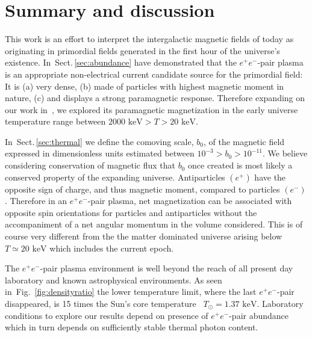 \documentclass[aps,prd,floatfix,reprint]{revtex4-2}
\newcommand*{\keV}{\text{ keV}}
\newcommand{\rf}[1]{Fig.~{\ref{#1}}}
\newcommand{\rsec}[1]{Sect.\,{\ref{#1}}}
\begin{document}

\section{Summary and discussion}
\label{sec:conclusions}
\noindent This work is an effort to interpret the intergalactic magnetic fields of today as originating in primordial fields generated in the first hour of the universe's existence. In~\rsec{sec:abundance} have demonstrated that the $e^{+}e^{-}$-pair plasma is an appropriate non-electrical current candidate source for the primordial field: It is (a) very dense, (b) made of particles with highest magnetic moment in nature, (c) and displays a strong paramagnetic response. Therefore expanding on our work in~\cite{Rafelski:2023emw}, we explored its paramagnetic magnetization in the early universe temperature range between $2000\keV>T>20\keV$. 

In~\rsec{sec:thermal} we define the comoving scale, $b_{0}$, of the magnetic field expressed in dimensionless units estimated between $10^{-3}>b_{0}>10^{-11}$. We believe considering conservation of magnetic flux that $b_{0}$ once created is most likely a conserved property of the expanding universe. Antiparticles $(e^{+})$ have the opposite sign of charge, and thus magnetic moment, compared to particles $(e^{-})$. Therefore in an $e^{+}e^{-}$-pair plasma, net magnetization can be associated with opposite spin orientations for particles and antiparticles without the accompaniment of a net angular momentum in the volume considered. This is of course very different from the the matter dominated universe arising below $T\simeq 20\keV$ which includes the current epoch.

The $e^{+}e^{-}$-pair plasma environment is well beyond the reach of all present day laboratory and known astrophysical environments. As seen in~\rf{fig:densityratio} the lower temperature limit, where the last $e^{+}e^{-}$-pair disappeared, is 15 times the Sun's core temperature~\cite{Bahcall:2000nu} $T_{\odot}=1.37\keV$. Laboratory conditions to explore our results depend on presence of $e^{+}e^{-}$-pair abundance which in turn depends on sufficiently stable thermal photon content.
\end{document}
